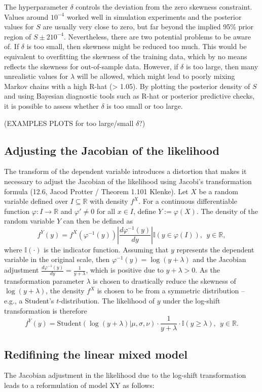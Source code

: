 The hyperparameter $\delta$ controls the deviation from the zero skewness constraint.
Values around $10^{-4}$ worked well in simulation experiments and the posterior values for $S$ are usually very close to zero, but far beyond the implied 95\% prior region of $S \pm 2 10^{-4}$.
Nevertheless, there are two potential problems to be aware of.
If $\delta$ is too small, then skewness might be reduced too much.
This would be equivalent to overfitting the skewness of the training data, which by no means reflects the skewness for out-of-sample data.
However, if $\delta$ is too large, then many unrealistic values for $\lambda$ will be allowed, which might lead to poorly mixing Markov chains with a high R-hat (> 1.05).
By plotting the posterior density of $S$ and using Bayesian diagnostic tools such as R-hat or posterior predictive checks, it is possible to assess whether $\delta$ is too small or too large.

(EXAMPLES PLOTS for too large/small $\delta$?)

\subsection{Adjusting the Jacobian of the likelihood}

The transform of the dependent variable introduces a distortion that makes it necessary to adjust the Jacobian of the likelihood using Jacobi's transformation formula (12.6, Jacod Protter / Theorem 1.101 Klenke).
Let $X$ be a random variable defined over $I \subseteq \mathbb{R}$ with density $f^X$. For a continuous differentiable function $\varphi: I \rightarrow \mathbb{R}$ and $\varphi' \ne 0$ for all $x \in I$, define $Y := \varphi(X)$.
The density of the random variable $Y$ can then be defined as
\begin{equation*}
    f^Y(y) = f^X(\varphi^{-1}(y))
    \left|\displaystyle \frac{d \varphi^{-1}(y)}{dy}\right|
    \mathbb{I}(y \in \varphi(I)), ~~ y \in \mathbb{R},
\end{equation*}
where $\mathbb{I}(\cdot)$ is the indicator function.
Assuming that $y$ represents the dependent variable in the original scale, then $\varphi^{-1}(y) = \log(y + \lambda)$ and the Jacobian adjustment $\displaystyle \frac{d \varphi^{-1}(y)}{dy} = \frac{1}{y + \lambda}$, which is positive due to $y + \lambda > 0$. As the transformation parameter $\lambda$ is chosen to drastically reduce the skewness of $\log(y + \lambda)$, the density $f^X$ is chosen to be from a symmetric distribution – e.g., a Student's $t$-distribution. The likelihood of $y$ under the log-shift transformation is therefore
\begin{equation}
    \displaystyle f^Y(y) = \text{Student}(\log(y + \lambda)| \mu , \sigma, \nu)
    \cdot \frac{1}{y + \lambda}
    \cdot\mathbb{I}(y \ge \lambda), ~~ y \in \mathbb{R}.
\end{equation}

\subsection{Redifining the linear mixed model}

The Jacobian adjustment in the likelihood due to the log-shift transformation leads to a reformulation of model XY as follows:


